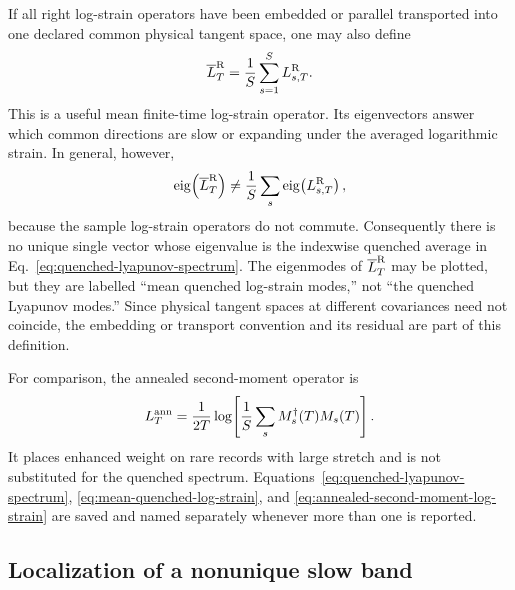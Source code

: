 \documentclass[aps,prx,twocolumn,floatfix,nofootinbib,superscriptaddress,longbibliography]{revtex4-2}
\begin{document}
If all right log-strain operators have been embedded or parallel transported into one
declared common physical tangent space, one may also define
\begin{equation}
 \overline L_T^{\rm R}
 =\frac1S\sum_{s=1}^S L_{s,T}^{\rm R}.
 \label{eq:mean-quenched-log-strain}
\end{equation}
This is a useful mean finite-time log-strain operator.  Its eigenvectors answer which
common directions are slow or expanding under the averaged logarithmic strain.  In
general, however,
\begin{equation}
 \operatorname{eig}\!\left(\overline L_T^{\rm R}\right)
 \ne \frac1S\sum_s\operatorname{eig}\!\left(L_{s,T}^{\rm R}\right),
 \label{eq:noncommuting-log-strain}
\end{equation}
because the sample log-strain operators do not commute.  Consequently there is no unique
single vector whose eigenvalue is the indexwise quenched average in
Eq.~\eqref{eq:quenched-lyapunov-spectrum}.  The eigenmodes of
$\overline L_T^{\rm R}$ may be plotted, but they are labelled ``mean quenched log-strain
modes,'' not ``the quenched Lyapunov modes.''  Since physical tangent spaces at different
covariances need not coincide, the embedding or transport convention and its residual are
part of this definition.

For comparison, the annealed second-moment operator is
\begin{equation}
 L_T^{\rm ann}
 =\frac1{2T}\log\!\left[\frac1S\sum_sM_s^\dagger(T)M_s(T)\right].
 \label{eq:annealed-second-moment-log-strain}
\end{equation}
It places enhanced weight on rare records with large stretch and is not substituted for
the quenched spectrum.  Equations~\eqref{eq:quenched-lyapunov-spectrum},
\eqref{eq:mean-quenched-log-strain}, and
\eqref{eq:annealed-second-moment-log-strain} are saved and named separately whenever more
than one is reported.

\subsection{Localization of a nonunique slow band}
\end{document}
